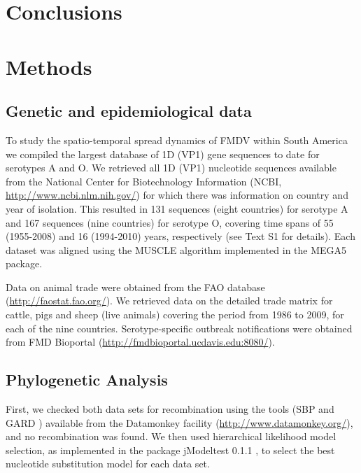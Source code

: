 \documentclass[10pt]{article}
\begin{document}
\section*{Conclusions}
\section*{Methods}

\subsection*{Genetic and epidemiological data}

To study the spatio-temporal spread dynamics of FMDV within South America we compiled the largest database of 1D (VP1) gene sequences to date for serotypes A and O.
We retrieved all 1D (VP1) nucleotide sequences available from the National Center for Biotechnology Information (NCBI, \url{ http://www.ncbi.nlm.nih.gov/}) for which there was information on country and year of isolation.
This resulted in 131 sequences (eight countries) for serotype A and 167 sequences (nine countries) for serotype O, covering time spans of 55 (1955-2008) and 16 (1994-2010) years, respectively (see Text S1 for details).
Each dataset was aligned using the MUSCLE algorithm implemented in the MEGA5 \cite{MEGA} package.

Data on animal trade were obtained from the FAO database (\url{http://faostat.fao.org/}).
We retrieved data on the detailed trade matrix for cattle, pigs and sheep (live animals) covering the period from 1986 to 2009, for each of the nine countries.
Serotype-specific outbreak notifications were obtained from FMD Bioportal (\url{http://fmdbioportal.ucdavis.edu:8080/}).

\subsection*{Phylogenetic Analysis}

First, we checked both data sets for recombination using the tools (SBP and GARD \cite{sbpgard}) available from the Datamonkey facility (\url{http://www.datamonkey.org/}), and no recombination was found.
We then used hierarchical likelihood model selection, as implemented in the package jModeltest 0.1.1 \cite{jmodel}, to select the best nucleotide substitution model for each data set.
\end{document}
